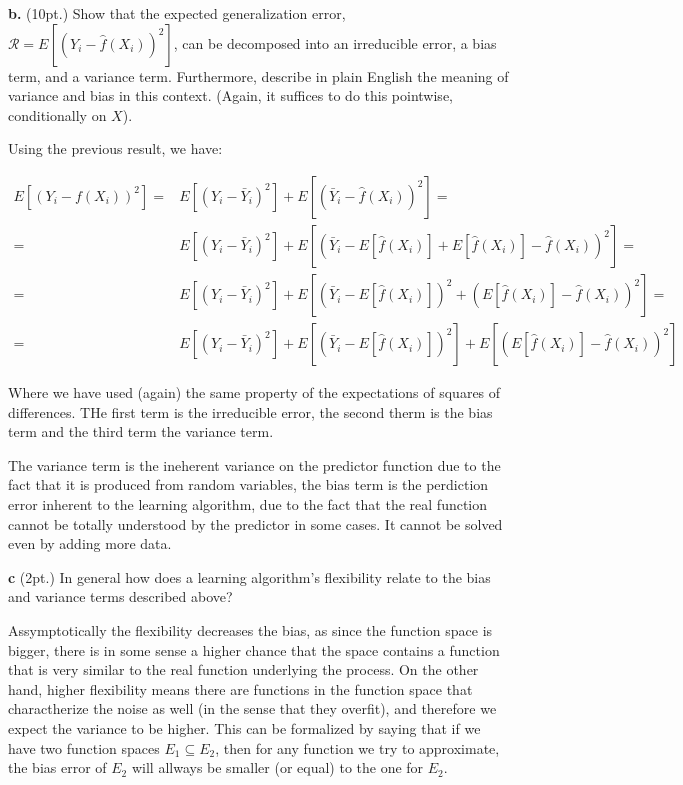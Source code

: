 \documentclass{article}
\begin{document}
    \textbf{b.} (10pt.) Show that the expected generalization error,
\(\mathcal{R} = E[(Y_i-\hat{f}(X_i))^2]\), can be decomposed into an
irreducible error, a bias term, and a variance term. Furthermore,
describe in plain English the meaning of variance and bias in this
context. (Again, it suffices to do this pointwise, conditionally on
\(X\)).

    Using the previous result, we have:

\begin{align*}
E[(Y_i-f(X_i))^2] =  &
E[(Y_i-\bar Y_i)^2] 
+ E[(\bar Y_i -\hat f(X_i))^2] = \\ = &
E[(Y_i-\bar Y_i)^2] 
+ E[(\bar Y_i -E[\hat f(X_i)]+E[\hat f(X_i)]-\hat f(X_i))^2] = \\ = &
E[(Y_i-\bar Y_i)^2] 
+ E[(\bar Y_i -E[\hat f(X_i)])^2+(E[\hat f(X_i)]-\hat f(X_i))^2] = \\ = &
E[(Y_i-\bar Y_i)^2] 
+ E[(\bar Y_i -E[\hat f(X_i)])^2]+E[(E[\hat f(X_i)]-\hat f(X_i))^2]
\end{align*}

Where we have used (again) the same property of the expectations of
squares of differences. THe first term is the irreducible error, the
second therm is the bias term and the third term the variance term.

The variance term is the ineherent variance on the predictor function
due to the fact that it is produced from random variables, the bias term
is the perdiction error inherent to the learning algorithm, due to the
fact that the real function cannot be totally understood by the
predictor in some cases. It cannot be solved even by adding more data.

    \textbf{c} (2pt.) In general how does a learning algorithm's flexibility
relate to the bias and variance terms described above?

    Assymptotically the flexibility decreases the bias, as since the
function space is bigger, there is in some sense a higher chance that
the space contains a function that is very similar to the real function
underlying the process. On the other hand, higher flexibility means
there are functions in the function space that charactherize the noise
as well (in the sense that they overfit), and therefore we expect the
variance to be higher. This can be formalized by saying that if we have
two function spaces \(E_1 \subseteq E_2\), then for any function we try
to approximate, the bias error of \(E_2\) will allways be smaller (or
equal) to the one for \(E_2\).
\end{document}
